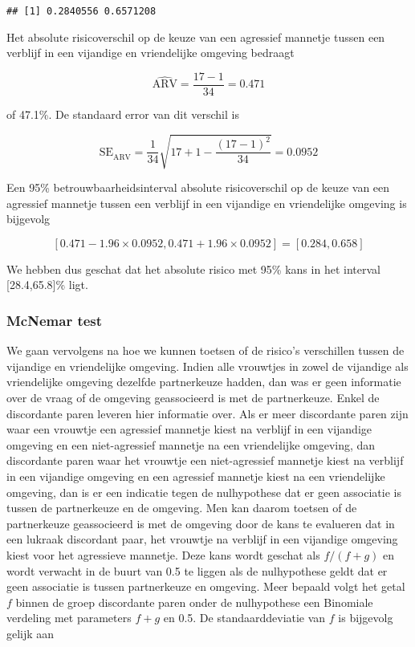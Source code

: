 \documentclass[
  12pt,dutch,coursenotes]{book}
\theoremstyle{definition}
\theoremstyle{definition}
\theoremstyle{definition}
\theoremstyle{remark}
\begin{document}
\begin{verbatim}
## [1] 0.2840556 0.6571208
\end{verbatim}

Het absolute risicoverschil op de keuze van een agressief mannetje tussen een verblijf in een vijandige en vriendelijke omgeving bedraagt

\begin{equation*}
\widehat{\text{ARV}}=\frac{17-1}{34}=0.471
\end{equation*}

of 47.1\%. De standaard error van dit verschil is

\begin{equation*}
\text{SE}_{\widehat{\text{ARV}}}=\frac{1}{34}\sqrt{17+1-\frac{(17-1)^2}{34}}=0.0952
\end{equation*}

Een 95\% betrouwbaarheidsinterval absolute risicoverschil op de keuze van een agressief mannetje tussen een verblijf in een vijandige en vriendelijke omgeving is bijgevolg

\begin{equation*}
\left[0.471-1.96\times 0.0952,0.471+1.96\times 0.0952\right]=[0.284,0.658]
\end{equation*}

We hebben dus geschat dat het absolute risico met 95\% kans in het interval {[}28.4,65.8{]}\% ligt.

\hypertarget{mcnemar-test}{%
\subsubsection{McNemar test}\label{mcnemar-test}}

We gaan vervolgens na hoe we kunnen toetsen of de risico's verschillen tussen de vijandige en vriendelijke omgeving.
Indien alle vrouwtjes in zowel de vijandige als vriendelijke omgeving dezelfde partnerkeuze hadden, dan was er geen informatie over de vraag of de omgeving geassocieerd is met de partnerkeuze. Enkel de discordante paren leveren hier informatie over. Als
er meer discordante paren zijn waar een vrouwtje een agressief mannetje kiest na verblijf in een vijandige omgeving en een niet-agressief mannetje na een vriendelijke omgeving, dan discordante paren waar het vrouwtje een niet-agressief mannetje kiest na verblijf in een vijandige omgeving en een agressief mannetje kiest na een vriendelijke omgeving, dan is er een
indicatie tegen de nulhypothese dat er geen associatie is tussen de partnerkeuze en de omgeving.
Men kan daarom toetsen of de partnerkeuze geassocieerd is met de omgeving door de kans te evalueren dat in een
lukraak discordant paar, het vrouwtje na verblijf in een vijandige omgeving kiest voor het agressieve mannetje.
Deze kans wordt geschat als \(f/(f+g)\) en wordt verwacht in de buurt
van 0.5 te liggen als de nulhypothese geldt dat er geen associatie is tussen partnerkeuze en omgeving.
Meer bepaald volgt het getal \(f\) binnen de
groep discordante paren onder de nulhypothese een Binomiale verdeling met
parameters \(f+g\) en 0.5. De standaarddeviatie van \(f\) is bijgevolg gelijk
aan
\end{document}
